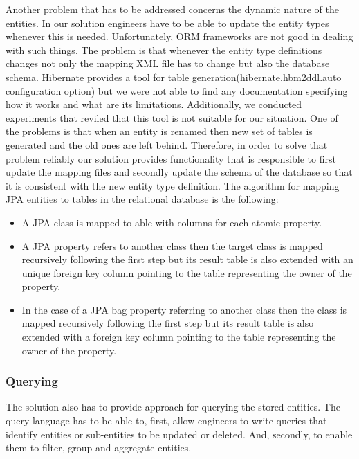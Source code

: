 Another problem that has to be addressed concerns the dynamic nature of the entities. In our solution engineers have to be able to update the entity types whenever this is needed. Unfortunately, ORM frameworks are not good in dealing with such things. The problem is that whenever the entity type definitions changes not only the mapping XML file has to change but also the database schema. Hibernate provides a tool for table generation(hibernate.hbm2ddl.auto configuration option) but we were not able to find any documentation specifying how it works and what are its limitations. Additionally, we conducted experiments that reviled that this tool is not suitable for our situation. One of the problems is that when an entity is renamed then new set of tables is generated and the old ones are left behind. Therefore, in order to solve that problem reliably our solution provides functionality that is responsible to first update the mapping files and secondly update the schema of the database so that it is consistent with the new entity type definition. The algorithm for mapping JPA entities to tables in the relational database is the following:

\begin{itemize}
	\item A JPA class is mapped to able with columns for each atomic property. 
	\item A JPA property refers to another class then the target class is mapped recursively following the first step but its result table is also extended with an unique foreign key column pointing to the table representing the owner of the property.
	\item In the case of a JPA bag property referring to another class then the class is mapped recursively following the first step but its result table is also extended with a foreign key column pointing to the table representing the owner of the property.
\end{itemize}
 

\subsubsection{Querying}

The solution also has to provide approach for querying the stored entities. The query language has to be able to, first, allow engineers to write queries that identify entities or sub-entities to be updated or deleted. And, secondly, to enable them to filter, group and aggregate entities. 

